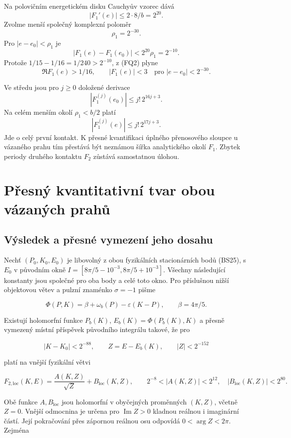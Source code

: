 \documentclass[11pt,a4paper]{article}
\theoremstyle{remark}\newtheorem{remark}[theorem]{Poznámka}
\numberwithin{equation}{section}
\begin{document}
Na polovičním energetickém disku Cauchyův vzorec dává \[
|F_1'(e)|\le 2\cdot8/b=2^{20}.
\] Zvolme menší společný komplexní poloměr \[
\boxed{\rho_1=2^{-30}.}
\tag{FQ8}
\] Pro \(|e-e_0|<\rho_1\) je \[
|F_1(e)-F_1(e_0)|<2^{20}\rho_1=2^{-10}.
\] Protože \(1/15-1/16=1/240>2^{-10}\), z (FQ2) plyne \[
\boxed{\Re F_1(e)>1/16,\qquad |F_1(e)|<3
\quad\text{pro }|e-e_0|<2^{-30}.}
\tag{FQ9}
\]

Ve středu jsou pro \(j\ge0\) doložené derivace \[
\boxed{|F_1^{(j)}(e_0)|\le j!\,2^{16j+3}.}
\tag{FQ10}
\] Na celém menším okolí \(\rho_1<b/2\) platí \[
|F_1^{(j)}(e)|\le j!\,2^{17j+3}.
\] Jde o celý první kontakt. K přesné kvantifikaci úplného přenosového
sloupce u vázaného prahu tím přestává být neznámou šířka analytického
okolí \(F_1\). Zbytek periody druhého kontaktu \(F_2\) zůstává
samostatnou úlohou.

\section{Přesný kvantitativní tvar obou vázaných prahů}
\hypertarget{vuxfdsledek-a-pux159esnuxe9-vymezenuxed-jeho-dosahu}{%
\subsection{Výsledek a přesné vymezení jeho
dosahu}\label{vuxfdsledek-a-pux159esnuxe9-vymezenuxed-jeho-dosahu}}

Nechť \((P_0,K_0,E_0)\) je libovolný z obou fyzikálních stacionárních
bodů (BS25), s \(E_0\) v původním okně
\(I=[8\pi/5-10^{-3},8\pi/5+10^{-3}]\). Všechny následující konstanty
jsou společné pro oba body a celé toto okno. Pro příslušnou nižší
objektovou větev a pulzní znaménko \(\sigma=-1\) pišme

\[
\Phi(P,K)=\beta+\omega_b(P)-\varepsilon(K-P),\qquad
\beta=4\pi/5.
\tag{BF1}
\]

Existují holomorfní funkce \(P_b(K)\), \(E_b(K)=\Phi(P_b(K),K)\) a
přesně vymezený místní příspěvek původního integrálu takové, že pro

\[
|K-K_0|<2^{-88},\qquad
Z=E-E_b(K),\qquad |Z|<2^{-152}
\tag{BF2}
\]

platí na vnější fyzikální větvi

\[
\boxed{
F_{2,\mathrm{loc}}(K,E)
=\frac{A(K,Z)}{\sqrt Z}+B_{\mathrm{loc}}(K,Z),
\qquad
2^{-8}<|A(K,Z)|<2^{12},\quad
|B_{\mathrm{loc}}(K,Z)|<2^{80}.}
\tag{BF3}
\]

Obě funkce \(A,B_{\mathrm{loc}}\) jsou holomorfní v obyčejných
proměnných \((K,Z)\), včetně \(Z=0\). Vnější odmocnina je určena pro
\(\operatorname{Im}Z>0\) kladnou reálnou i imaginární částí. Její
pokračování přes zápornou reálnou osu odpovídá \(0<\arg Z<2\pi\).
Zejména
\end{document}
